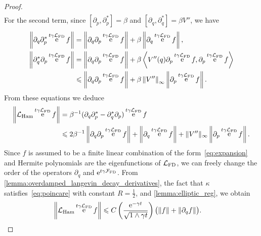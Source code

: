 \documentclass[11pt,a4paper]{article}
\DeclareMathOperator{\e}{e}
\newcommand{\commut}[2]{[#1, #2]}
\theoremstyle{plain}
\numberwithin{equation}{section}
\renewcommand{\leq}{\leqslant}
\begin{document}
\begin{proof}
\begin{align}
    \end{align}
    For the second term, since $\commut{\partial_p}{\partial_p^*} = \beta$ and $\commut{\partial_q}{\partial_q^*} = \beta V''$,
    we have
    \begin{align*}
        \norm{\partial_q \partial_p^* \e^{t \gamma \mathcal L_{\rm FD}} f}
        &= \norm{\partial_q \partial_p \e^{t \gamma \mathcal L_{\rm FD}} f} + \beta \norm{\partial_q \e^{t \gamma \mathcal L_{\rm FD}} f}, \\
        \norm{\partial_q^* \partial_p \e^{t \gamma \mathcal L_{\rm FD}} f}
        &= \norm{\partial_q \partial_p \e^{t \gamma \mathcal L_{\rm FD}} f}
        + \beta \ip{V''(q) \partial_p \e^{t \gamma \mathcal L_{\rm FD}} f}{\partial_p \e^{t \gamma \mathcal L_{\rm FD}} f} \\
        &\leq \norm{\partial_q \partial_p \e^{t \gamma \mathcal L_{\rm FD}} f}
        + \beta \norm{V''}[\infty] \norm{\partial_p \e^{t \gamma \mathcal L_{\rm FD}} f}.
    \end{align*}
    From these equations we deduce
    \begin{align}
        \notag
        \norm{\mathcal L_{\rm Ham} \e^{t \gamma \mathcal L_{\rm FD}} f}
        &= \beta^{-1} (\partial_q \partial_p^* - \partial_q^* \partial_p) \e^{t \gamma \mathcal L_{\rm FD}} f \\
        \label{eq:reasoning_action_lham}
        &\leq 2 \beta^{-1} \norm{\partial_q \partial_p \e^{t \gamma \mathcal L_{\rm FD}} f}
        + \norm{\partial_q \e^{t \gamma \mathcal L_{\rm FD}} f}
        + \norm*{V''}[\infty] \norm{\partial_p \e^{t \gamma \mathcal L_{\rm FD}} f}.
    \end{align}
    Since $f$ is assumed to be a finite linear combination of the form~\eqref{eq:expansion} and
    Hermite polynomials are the eigenfunctions of $\mathcal L_{\rm FD}$,
    we can freely change the order of the operators $\partial_q$ and $\e^{t \gamma \mathcal F_{\rm FD}}$.
    From \cref{lemma:overdamped_langevin_decay_derivatives}, the fact that $\kappa$ satisfies~\eqref{eq:poincare} with constant $R = \frac{1}{2}$,
    and \cref{lemma:elliptic_reg},
    we obtain
    \begin{align*}
        \norm{\mathcal L_{\rm Ham} \e^{t \gamma \mathcal L_{\rm FD}} f}
        &\leq C \left( \frac{\e^{-\gamma t}}{\sqrt{1 \wedge \gamma t}} \right) \bigl( \norm{f} + \norm{\partial_q f} \bigr).

\end{align*}
\end{proof}
\end{document}
